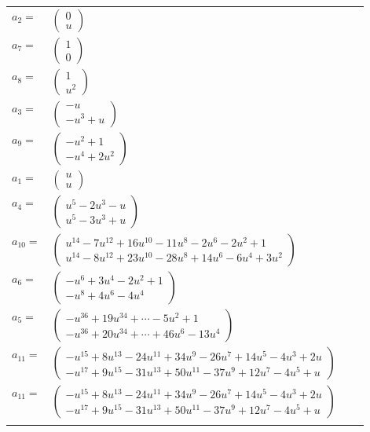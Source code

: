\documentclass[1p]{elsarticle_modified}
\theoremstyle{definition}
\begin{document}
\begin{tabular}{m{7pt} m{180pt} m{7pt} m{180pt} }
\flushright $a_{2}=$&$\begin{pmatrix}0\\u\end{pmatrix}$ \\
\flushright $a_{7}=$&$\begin{pmatrix}1\\0\end{pmatrix}$ \\
\flushright $a_{8}=$&$\begin{pmatrix}1\\u^2\end{pmatrix}$ \\
\flushright $a_{3}=$&$\begin{pmatrix}- u\\- u^3+u\end{pmatrix}$ \\
\flushright $a_{9}=$&$\begin{pmatrix}- u^2+1\\- u^4+2 u^2\end{pmatrix}$ \\
\flushright $a_{1}=$&$\begin{pmatrix}u\\u\end{pmatrix}$ \\
\flushright $a_{4}=$&$\begin{pmatrix}u^5-2 u^3- u\\u^5-3 u^3+u\end{pmatrix}$ \\
\flushright $a_{10}=$&$\begin{pmatrix}u^{14}-7 u^{12}+16 u^{10}-11 u^8-2 u^6-2 u^2+1\\u^{14}-8 u^{12}+23 u^{10}-28 u^8+14 u^6-6 u^4+3 u^2\end{pmatrix}$ \\
\flushright $a_{6}=$&$\begin{pmatrix}- u^6+3 u^4-2 u^2+1\\- u^8+4 u^6-4 u^4\end{pmatrix}$ \\
\flushright $a_{5}=$&$\begin{pmatrix}- u^{36}+19 u^{34}+\cdots-5 u^2+1\\- u^{36}+20 u^{34}+\cdots+46 u^6-13 u^4\end{pmatrix}$ \\
\flushright $a_{11}=$&$\begin{pmatrix}- u^{15}+8 u^{13}-24 u^{11}+34 u^9-26 u^7+14 u^5-4 u^3+2 u\\- u^{17}+9 u^{15}-31 u^{13}+50 u^{11}-37 u^9+12 u^7-4 u^5+u\end{pmatrix}$\\ \flushright $a_{11}=$&$\begin{pmatrix}- u^{15}+8 u^{13}-24 u^{11}+34 u^9-26 u^7+14 u^5-4 u^3+2 u\\- u^{17}+9 u^{15}-31 u^{13}+50 u^{11}-37 u^9+12 u^7-4 u^5+u\end{pmatrix}$\\&\end{tabular}
\end{document}
